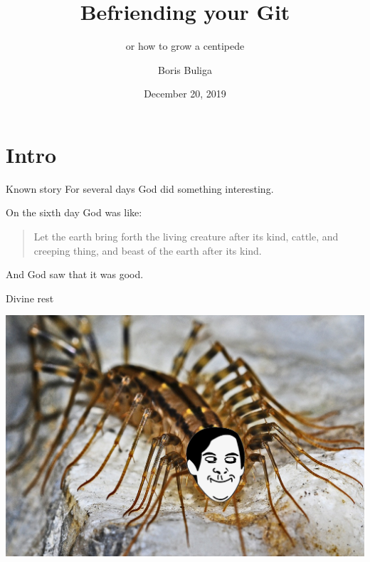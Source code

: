 \documentclass[presentation,aspectratio=169,smaller]{beamer}
\author{Boris Buliga}
\date{December 20, 2019}
\title{Befriending your Git}
\subtitle{or how to grow a centipede}
\begin{document}
\maketitle
\newcommand{\mathcolorbox}[2]{%
  \begingroup
  \setlength{\fboxsep}{2pt}%
  \colorbox{#1}{$\displaystyle #2$}%
  \endgroup
}


\section*{Intro}
\label{sec:orgd1f55df}
\begin{frame}[label={sec:orgc9a8f76}]{Known story}
For several days God did something interesting.

On the sixth day God was like:

\begin{quote}
Let the earth bring forth the living creature after its kind, cattle, and
creeping thing, and beast of the earth after its kind.
\end{quote}

And God saw that it was good.
\end{frame}

\begin{frame}[label={sec:org5ed7572}]{Divine rest}
\pause

\begin{center}
\includegraphics[width=.9\linewidth]{images/creepy-centipede.png}
\end{center}
\end{frame}
\end{document}
